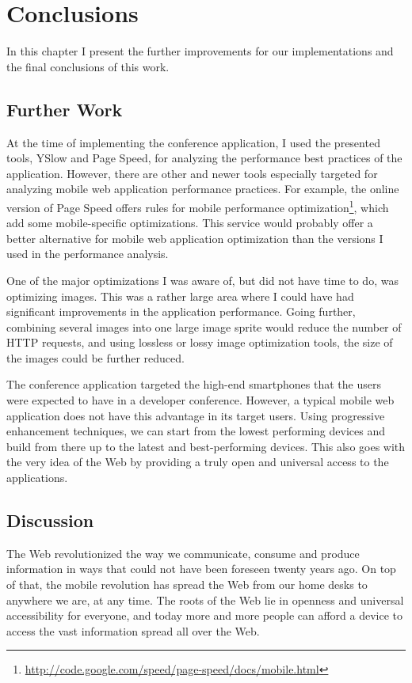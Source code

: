 \chapter{Conclusions}
\label{chapter:conclusions}

In this chapter I present the further improvements for our
implementations and the final conclusions of this work.

\section{Further Work}

At the time of implementing the conference application, I used the
presented tools, YSlow and Page Speed, for analyzing the performance
best practices of the application. However, there are other and newer
tools especially targeted for analyzing mobile web application
performance practices. For example, the online version of Page Speed
offers rules for mobile performance
optimization\footnote{\url{http://code.google.com/speed/page-speed/docs/mobile.html}},
which add some mobile-specific optimizations. This service would
probably offer a better alternative for mobile web application
optimization than the versions I used in the performance analysis.

One of the major optimizations I was aware of, but did not have time
to do, was optimizing images. This was a rather large area where I
could have had significant improvements in the application
performance. Going further, combining several images into one large
image sprite would reduce the number of HTTP requests, and using
lossless or lossy image optimization tools, the size of the images
could be further reduced.

The conference application targeted the high-end smartphones that the
users were expected to have in a developer conference. However, a
typical mobile web application does not have this advantage in its
target users. Using progressive enhancement techniques, we can start
from the lowest performing devices and build from there up to the
latest and best-performing devices. This also goes with the very idea
of the Web by providing a truly open and universal access to the
applications.

\section{Discussion}

The Web revolutionized the way we communicate, consume and produce
information in ways that could not have been foreseen twenty years
ago. On top of that, the mobile revolution has spread the Web from our
home desks to anywhere we are, at any time. The roots of the Web lie
in openness and universal accessibility for everyone, and today more
and more people can afford a device to access the vast information
spread all over the Web.

